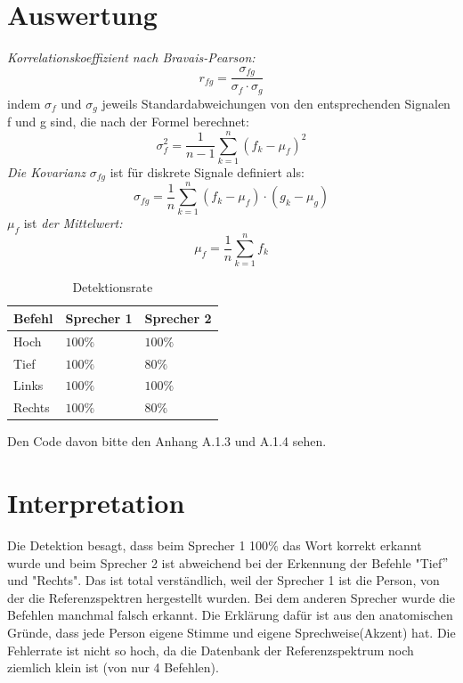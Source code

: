\documentclass[12pt, oneside, a4paper, \docLanguage]{report}
\begin{document}
\section{Auswertung}

\label{chap:VERSUCH_2_AUSWERTUNG}

\textit{Korrelationskoeffizient nach Bravais-Pearson:} $$r_{fg}=\frac{\sigma_{fg}}{\sigma_{f}\cdot\sigma_{g}}$$ indem $\sigma_{f}$ und $\sigma_{g}$ jeweils Standardabweichungen von den entsprechenden Signalen f und g sind, die nach der Formel berechnet: $$\sigma^2_f=\frac{1}{n-1}\sum_{k=1}^{n}(f_k-\mu_f)^2$$
\qquad\textit{Die Kovarianz} $\sigma_{fg}$ ist für diskrete Signale definiert als:$$\sigma_{fg}=\frac{1}{n}\sum_{k=1}^{n}(f_k-\mu_f)\cdot(g_k-\mu_g)$$
\qquad $\mu_f$ ist \textit{der Mittelwert:} $$\mu_f=\frac{1}{n}\sum_{k=1}^nf_k$$

\begin{table}[H]
\centering
\begin{tabular}{|l|l|l|}
\hline
\multicolumn{1}{|c|}{Befehl} & \multicolumn{1}{c|}{Sprecher 1}		& \multicolumn{1}{c|}{Sprecher 2}			\\ \hline
Hoch						&$100\%$				&$100\%$				\\ \hline
Tief						&$100\%$				&$80\%$					\\ \hline
Links						&$100\%$				&$100\%$				\\ \hline
Rechts						&$100\%$				&$80\%$					\\ \hline
\end{tabular}
\caption{Detektionsrate}
\end{table}



Den Code davon bitte den Anhang A.1.3 und A.1.4 sehen.

\section{Interpretation}
\label{chap:VERSUCH_2_INTERPRETATION}
\qquad Die Detektion besagt, dass beim Sprecher 1 100$\%$ das Wort korrekt erkannt wurde und beim Sprecher 2 ist abweichend bei der Erkennung der Befehle "Tief$"$ und "Rechts". Das ist total verständlich, weil der Sprecher 1 ist die Person, von der die Referenzspektren hergestellt wurden. Bei dem anderen Sprecher wurde die Befehlen manchmal falsch erkannt. Die Erklärung dafür ist aus den anatomischen Gründe, dass jede Person eigene Stimme und eigene Sprechweise(Akzent) hat. Die Fehlerrate ist nicht so hoch, da die Datenbank der Referenzspektrum noch ziemlich klein ist (von nur 4 Befehlen).
\end{document}
